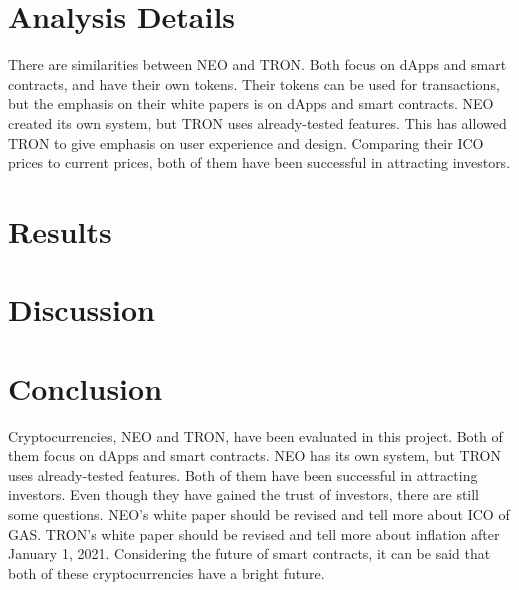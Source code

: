 \documentclass[12pt, a4paper]{article}
\begin{document}
\section{Analysis Details}
There are similarities between NEO and TRON.  Both focus on dApps and smart contracts, and have their own tokens.  Their tokens can be used for transactions, but the emphasis on their white papers is on dApps and smart contracts.  NEO created its own system, but TRON uses already-tested features.  This has allowed TRON to give emphasis on user experience and design.  Comparing their ICO prices to current prices, both of them have been successful in attracting investors. \cite{3, 8}

\section{Results}

\section{Discussion}

\section{Conclusion}
Cryptocurrencies, NEO and TRON, have been evaluated in this project.  Both of them focus on dApps and smart contracts.  NEO has its own system, but TRON uses already-tested features.  Both of them have been successful in attracting investors.  Even though they have gained the trust of investors, there are still some questions.  NEO's white paper should be revised and tell more about ICO of GAS.  TRON's white paper should be revised and tell more about inflation after January 1, 2021.  Considering the future of smart contracts, it can be said that both of these cryptocurrencies have a bright future.


\newpage
\printbibliography[heading=bibintoc]
\end{document}
